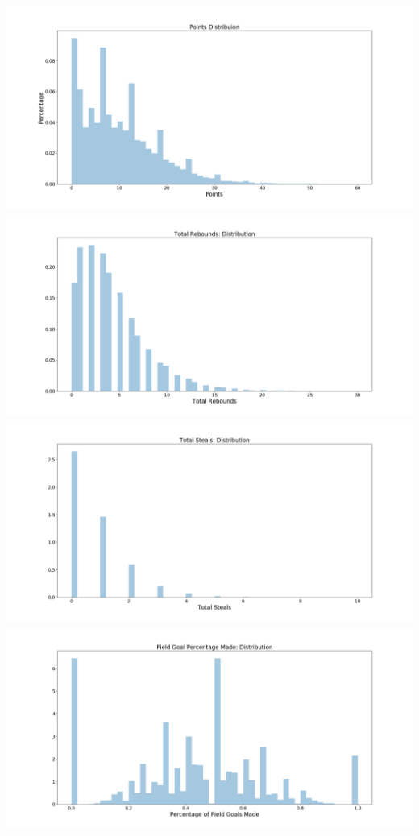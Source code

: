 \documentclass[12pt, authoryear]{elsarticle}
\begin{document}
\includegraphics[scale=0.3]{Points_Distribution}\\
\includegraphics[scale=0.3]{Rebounds_Distribution}\\
\includegraphics[scale=0.3]{Steals_Distribution}\\
\includegraphics[scale=0.3]{FG_Percent_Distribution}\\
\end{document}
